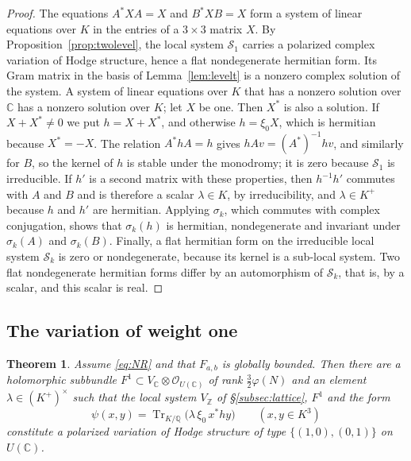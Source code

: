 \documentclass[11pt]{amsart}
\newtheorem{theorem}{Theorem}[section]
\theoremstyle{definition}
\theoremstyle{remark}
\numberwithin{equation}{section}
\newcommand{\Q}{\mathbb{Q}}
\newcommand{\Z}{\mathbb{Z}}
\newcommand{\C}{\mathbb{C}}
\newcommand{\cS}{\mathcal{S}}
\newcommand{\cO}{\mathcal{O}}
\DeclareMathOperator{\Tr}{Tr}
\newcommand{\Fab}{F_{a,b}}
\begin{document}
\begin{proof}
The equations $A^*XA=X$ and $B^*XB=X$ form a system of linear equations over $K$ in the entries of a $3\times3$ matrix $X$. By Proposition~\ref{prop:twolevel}, the local system $\cS_1$ carries a polarized complex variation of Hodge structure, hence a flat nondegenerate hermitian form. Its Gram matrix in the basis of Lemma~\ref{lem:levelt} is a nonzero complex solution of the system. A system of linear equations over $K$ that has a nonzero solution over $\C$ has a nonzero solution over $K$; let $X$ be one. Then $X^*$ is also a solution. If $X+X^*\ne0$ we put $h=X+X^*$, and otherwise $h=\xi_0X$, which is hermitian because $X^*=-X$. The relation $A^*hA=h$ gives $hAv=(A^*)^{-1}hv$, and similarly for $B$, so the kernel of $h$ is stable under the monodromy; it is zero because $\cS_1$ is irreducible. If $h'$ is a second matrix with these properties, then $h^{-1}h'$ commutes with $A$ and $B$ and is therefore a scalar $\lambda\in K$, by irreducibility, and $\lambda\in K^+$ because $h$ and $h'$ are hermitian. Applying $\sigma_k$, which commutes with complex conjugation, shows that $\sigma_k(h)$ is hermitian, nondegenerate and invariant under $\sigma_k(A)$ and $\sigma_k(B)$. Finally, a flat hermitian form on the irreducible local system $\cS_k$ is zero or nondegenerate, because its kernel is a sub-local system. Two flat nondegenerate hermitian forms differ by an automorphism of $\cS_k$, that is, by a scalar, and this scalar is real.
\end{proof}

\subsection{The variation of weight one}
\begin{theorem}\label{thm:wt1}
Assume \eqref{eq:NR} and that $\Fab$ is globally bounded. Then there are a holomorphic subbundle $F^1\subset V_\C\otimes\cO_{U(\C)}$ of rank $\frac32\varphi(N)$ and an element $\lambda\in(K^+)^\times$ such that the local system $V_\Z$ of \S\ref{subsec:lattice}, $F^1$ and the form
\[
\psi(x,y)=\Tr_{K/\Q}\big(\lambda\,\xi_0\,x^*hy\big)\qquad(x,y\in K^3)
\]
constitute a polarized variation of Hodge structure of type $\{(1,0),(0,1)\}$ on $U(\C)$.
\end{theorem}
\end{document}

